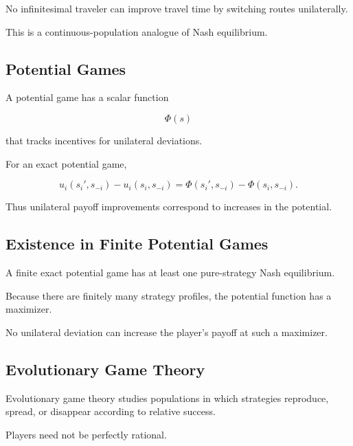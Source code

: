 No infinitesimal traveler can improve travel time by switching routes
unilaterally.

This is a continuous-population analogue of Nash equilibrium.

\subsection{Potential Games}
\label{subsec:potential-games}

A potential game has a scalar function

\[
\boxed{
\Phi(s)
}
\]

that tracks incentives for unilateral deviations.

For an exact potential game,

\[
\boxed{
u_i(s_i',s_{-i})
-
u_i(s_i,s_{-i})
=
\Phi(s_i',s_{-i})
-
\Phi(s_i,s_{-i}).
}
\]

Thus unilateral payoff improvements correspond to increases in the
potential.

\subsection{Existence in Finite Potential Games}
\label{subsec:potential-game-existence}

A finite exact potential game has at least one pure-strategy Nash
equilibrium.

Because there are finitely many strategy profiles, the potential function
has a maximizer.

No unilateral deviation can increase the player's payoff at such a
maximizer.

\subsection{Evolutionary Game Theory}
\label{subsec:evolutionary-game-theory}

Evolutionary game theory studies populations in which strategies reproduce,
spread, or disappear according to relative success.

Players need not be perfectly rational.

